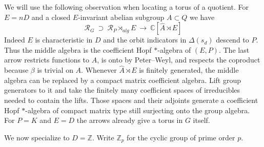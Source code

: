 \documentclass[11pt,a4paper]{article}
\theoremstyle{remark}
\begin{document}
We will use the following observation when locating a torus of a
quotient. For $E=nD$ and a closed $E$-invariant abelian subgroup
$A\subset Q$ we have
\[
 \mathcal R_G\ \supset\
 \mathcal R_P\rtimes_{alg} E
 \ \longrightarrow\
 \mathbb C[\widehat A\rtimes E]
\]
Indeed $E$ is characteristic in $D$ and the orbit indicators in
$\Delta(s_d)$ descend to $P$. Thus the middle algebra is the coefficient
Hopf $*$-algebra of $(E,P)$. The last arrow restricts functions to $A$,
is onto by Peter--Weyl, and respects the coproduct because $\beta$ is
trivial on $A$. Whenever $\widehat A\rtimes E$ is finitely generated,
the middle algebra can be replaced by a compact matrix coefficient
algebra. Lift group generators to it and take the finitely many coefficient
spaces of irreducibles needed to contain the lifts. Those spaces and
their adjoints generate a coefficient Hopf $*$-algebra of compact matrix
type still surjecting onto the group algebra. For $P=K$ and $E=D$ the
arrows already give a torus in $G$ itself.

We now specialize to $D=\mathbb Z$. Write $\mathbb Z_p$ for the cyclic group
of prime order $p$.
\end{document}
